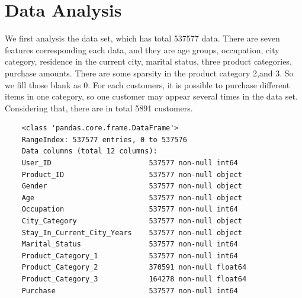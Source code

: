 \documentclass{article}
\begin{document}
\section{Data Analysis}
    We first analysis the data set, which has total 537577 data.  There are seven features corresponding each data, and they are age groups, occupation, city category, residence in the current city, marital status, three product categories, purchase amounts. There are some sparsity in the product category 2,and 3. So we fill those blank as 0.   For each customers, it is possible to purchase  different items in one category, so one customer may appear several times in the data set. Considering that, there are in total 5891 customers.
    \begin{verbatim}
    <class 'pandas.core.frame.DataFrame'>
    RangeIndex: 537577 entries, 0 to 537576
    Data columns (total 12 columns):
    User_ID                       537577 non-null int64
    Product_ID                    537577 non-null object
    Gender                        537577 non-null object
    Age                           537577 non-null object
    Occupation                    537577 non-null int64
    City_Category                 537577 non-null object
    Stay_In_Current_City_Years    537577 non-null object
    Marital_Status                537577 non-null int64
    Product_Category_1            537577 non-null int64
    Product_Category_2            370591 non-null float64
    Product_Category_3            164278 non-null float64
    Purchase                      537577 non-null int64
    \end{verbatim} 
\end{document}
